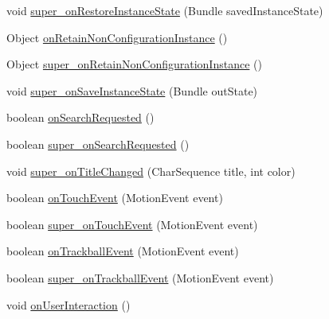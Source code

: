 \begin{DoxyCompactItemize}
\item 
void \hyperlink{classorg_1_1qtproject_1_1qt5_1_1android_1_1bindings_1_1_qt_activity_a73303f1db92072963fe8592eb05b0258}{super\-\_\-on\-Restore\-Instance\-State} (Bundle saved\-Instance\-State)
\item 
Object \hyperlink{classorg_1_1qtproject_1_1qt5_1_1android_1_1bindings_1_1_qt_activity_a5954d45f88dd09deba757e671de9077d}{on\-Retain\-Non\-Configuration\-Instance} ()
\item 
Object \hyperlink{classorg_1_1qtproject_1_1qt5_1_1android_1_1bindings_1_1_qt_activity_a4fa6ba75523273de5b492052f1ae06f0}{super\-\_\-on\-Retain\-Non\-Configuration\-Instance} ()
\item 
void \hyperlink{classorg_1_1qtproject_1_1qt5_1_1android_1_1bindings_1_1_qt_activity_a8fb26c42bd8d7516bf863cc5fb50e287}{super\-\_\-on\-Save\-Instance\-State} (Bundle out\-State)
\item 
boolean \hyperlink{classorg_1_1qtproject_1_1qt5_1_1android_1_1bindings_1_1_qt_activity_aa1c033b0b0bbc4cb9c193b239992fcb8}{on\-Search\-Requested} ()
\item 
boolean \hyperlink{classorg_1_1qtproject_1_1qt5_1_1android_1_1bindings_1_1_qt_activity_a41f90d68a12b8140f7b0f4c4037c2567}{super\-\_\-on\-Search\-Requested} ()
\item 
void \hyperlink{classorg_1_1qtproject_1_1qt5_1_1android_1_1bindings_1_1_qt_activity_aa3982942fa042ca69a13ffbaff0ef403}{super\-\_\-on\-Title\-Changed} (Char\-Sequence title, int color)
\item 
boolean \hyperlink{classorg_1_1qtproject_1_1qt5_1_1android_1_1bindings_1_1_qt_activity_ada200302a153c7dbab3e55b746a7a179}{on\-Touch\-Event} (Motion\-Event event)
\item 
boolean \hyperlink{classorg_1_1qtproject_1_1qt5_1_1android_1_1bindings_1_1_qt_activity_a216ec445b2cc31beac2032e38dd5e949}{super\-\_\-on\-Touch\-Event} (Motion\-Event event)
\item 
boolean \hyperlink{classorg_1_1qtproject_1_1qt5_1_1android_1_1bindings_1_1_qt_activity_a27faf58c38193faea2782ff85cedb567}{on\-Trackball\-Event} (Motion\-Event event)
\item 
boolean \hyperlink{classorg_1_1qtproject_1_1qt5_1_1android_1_1bindings_1_1_qt_activity_a4ee363f63dfde917e450b70c8880fef9}{super\-\_\-on\-Trackball\-Event} (Motion\-Event event)
\item 
void \hyperlink{classorg_1_1qtproject_1_1qt5_1_1android_1_1bindings_1_1_qt_activity_a3917d7d3ac6ab5bf31444d31b2784828}{on\-User\-Interaction} ()
\item 

\end{DoxyCompactItemize}
